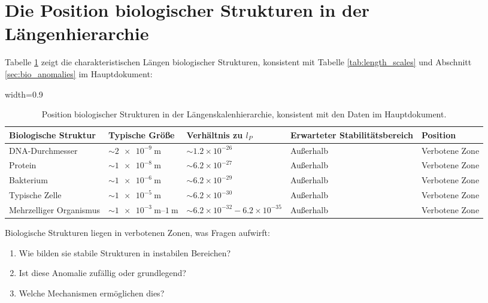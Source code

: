 \documentclass[12pt,a4paper]{article}
\newcommand{\tablescale}{0.9}
\begin{document}
	\section{Die Position biologischer Strukturen in der Längenhierarchie}
	\label{sec:position_biologisch}
	
	Tabelle \ref{tab:bio_structures} zeigt die charakteristischen Längen biologischer Strukturen, konsistent mit Tabelle \ref{tab:length_scales} und Abschnitt \ref{sec:bio_anomalies} im Hauptdokument:
	
	\begin{table}[H]
		\centering
		\begin{adjustbox}{width=\tablescale\textwidth}
			\begin{tabular}{lllll}
				\toprule
				\textbf{Biologische Struktur} & \textbf{Typische Größe} & \textbf{Verhältnis zu $l_P$} & \textbf{Erwarteter Stabilitätsbereich} & \textbf{Position} \\
				\midrule
				DNA-Durchmesser & $\sim \SI{2e-9}{\meter}$ & $\sim 1.2 \times 10^{-26}$ & Außerhalb & Verbotene Zone \\
				Protein & $\sim \SI{1e-8}{\meter}$ & $\sim 6.2 \times 10^{-27}$ & Außerhalb & Verbotene Zone \\
				Bakterium & $\sim \SI{1e-6}{\meter}$ & $\sim 6.2 \times 10^{-29}$ & Außerhalb & Verbotene Zone \\
				Typische Zelle & $\sim \SI{1e-5}{\meter}$ & $\sim 6.2 \times 10^{-30}$ & Außerhalb & Verbotene Zone \\
				Mehrzelliger Organismus & $\sim \SIrange{1e-3}{1}{\meter}$ & $\sim 6.2 \times 10^{-32} - 6.2 \times 10^{-35}$ & Außerhalb & Verbotene Zone \\
				\bottomrule
			\end{tabular}
		\end{adjustbox}
		\caption{Position biologischer Strukturen in der Längenskalenhierarchie, konsistent mit den Daten im Hauptdokument.}
		\label{tab:bio_structures}
	\end{table}
	
	Biologische Strukturen liegen in verbotenen Zonen, was Fragen aufwirft:
	\begin{enumerate}
		\item Wie bilden sie stabile Strukturen in instabilen Bereichen?
		\item Ist diese Anomalie zufällig oder grundlegend?
		\item Welche Mechanismen ermöglichen dies?
	\end{enumerate}
	
\end{document}
